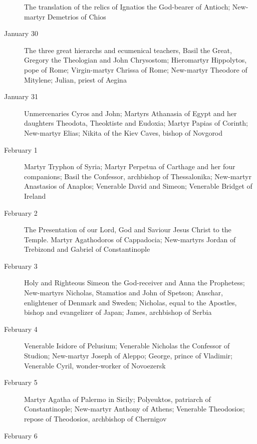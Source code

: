 \begin{description}
The translation of the relics of Ignatios the God-bearer of Antioch; New-martyr Demetrios of Chios

\item[January 30]

The three great hierarchs and ecumenical teachers, Basil the Great, Gregory the Theologian and John Chrysostom; Hieromartyr Hippolytos, pope of Rome; Virgin-martyr Chrissa of Rome; New-martyr Theodore of Mitylene; Julian, priest of Aegina

\item[January 31]

Unmercenaries Cyros and John; Martyrs Athanasia of Egypt and her daughters Theodota, Theoktiste and Eudoxia; Martyr Papias of Corinth; New-martyr Elias; Nikita of the Kiev Caves, bishop of Novgorod

\item[February 1]

Martyr Tryphon of Syria; Martyr Perpetua of Carthage and her four companions; Basil the Confessor, archbishop of Thessalonika; New-martyr Anastasios of Anaplos; Venerable David and Simeon; Venerable Bridget of Ireland

\item[February 2]

The Presentation of our Lord, God and Saviour Jesus Christ to the Temple. Martyr Agathodoros of Cappadocia; New-martyrs Jordan of Trebizond and Gabriel of Constantinople

\item[February 3]

Holy and Righteous Simeon the God-receiver and Anna the Prophetess; New-martyrs Nicholas, Stamatios and John of Spetson; Anschar, enlightener of Denmark and Sweden; Nicholas, equal to the Apostles, bishop and evangelizer of Japan; James, archbishop of Serbia

\item[February 4]

Venerable Isidore of Pelusium; Venerable Nicholas the Confessor of Studion; New-martyr Joseph of Aleppo; George, prince of Vladimir; Venerable Cyril, wonder-worker of Novoezersk

\item[February 5]

Martyr Agatha of Palermo in Sicily; Polyeuktos, patriarch of Constantinople; New-martyr Anthony of Athens; Venerable Theodosios; repose of Theodosios, archbishop of Chernigov

\item[February 6]


\end{description}

